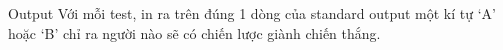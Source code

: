Output  
Với mỗi test, in ra trên đúng 1 dòng của standard output một kí tự ‘A’ hoặc ‘B’ chỉ ra người nào sẽ có chiến lược giành chiến thắng.